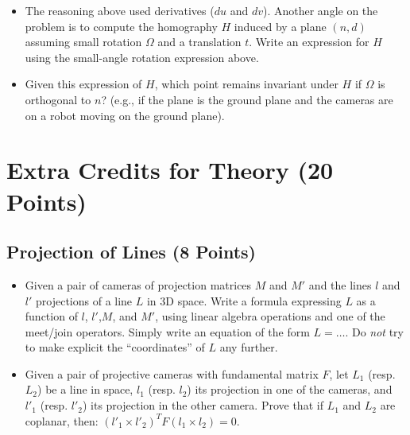 \documentclass[11pt]{article}
\begin{document}
\begin{itemize}
\item The reasoning above used derivatives ($du$ and $dv$). Another angle on the problem is to compute the homography $H$ induced by 
a plane $(n,d)$ assuming small rotation $\Omega$ and a translation $t$. Write an expression for $H$ using the 
small-angle rotation expression above.

\item Given this expression of $H$, which point remains invariant under $H$ if $\Omega$ is orthogonal to $n$? (e.g., if the plane is 
the ground plane and the cameras are on a robot moving on the ground plane).
\end{itemize}


\section{Extra Credits for Theory (20 Points)}

\subsection{Projection of Lines (8 Points)}
\begin{itemize}
\item Given a pair of cameras of projection matrices $M$ and $M'$ and the lines $l$ and $l'$ projections of a line $L$ in 3D space. Write a formula expressing $L$ as a function of $l$, $l'$,$M$, and $M'$, using linear algebra operations and one of the meet/join operators. Simply write an equation of the form $L = \ldots$. Do {\it not} try to make explicit the “coordinates” of $L$ any further.
\item Given a pair of projective cameras with fundamental matrix $F$, let $L_1$ (resp. $L_2$) be a line in space, $l_1$ (resp. $l_2$) its projection in one of the cameras, and $l'_1$ (resp. $l'_2$) its projection in the other camera. Prove that if $L_1$ and $L_2$ are coplanar, then: $(l'_1 \times l'_2)^TF(l_1 \times l_2) = 0$.
\end{itemize}
\end{document}
